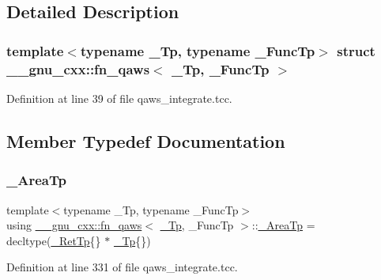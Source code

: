 \subsection{Detailed Description}
\subsubsection*{template$<$typename \+\_\+\+Tp, typename \+\_\+\+Func\+Tp$>$\newline
struct \+\_\+\+\_\+gnu\+\_\+cxx\+::fn\+\_\+qaws$<$ \+\_\+\+Tp, \+\_\+\+Func\+Tp $>$}



Definition at line 39 of file qaws\+\_\+integrate.\+tcc.



\subsection{Member Typedef Documentation}
\mbox{\label{struct____gnu__cxx_1_1fn__qaws_af9bc03c839ab7dc2e591b06cd3957a21}} 
\subsubsection{\texorpdfstring{\+\_\+\+Area\+Tp}{\_AreaTp}}
{\footnotesize\ttfamily template$<$typename \+\_\+\+Tp, typename \+\_\+\+Func\+Tp$>$ \\
using \hyperlink{struct____gnu__cxx_1_1fn__qaws}{\+\_\+\+\_\+gnu\+\_\+cxx\+::fn\+\_\+qaws}$<$ \hyperlink{namespace____gnu__cxx_a3b19a9c800ca194374ef9172290f7d79}{\+\_\+\+Tp}, \+\_\+\+Func\+Tp $>$\+::\hyperlink{struct____gnu__cxx_1_1fn__qaws_af9bc03c839ab7dc2e591b06cd3957a21}{\+\_\+\+Area\+Tp} =  decltype(\hyperlink{struct____gnu__cxx_1_1fn__qaws_afb28f16c42d0f494bfe2d48e2524a5b1}{\+\_\+\+Ret\+Tp}\{\} $\ast$ \hyperlink{namespace____gnu__cxx_a3b19a9c800ca194374ef9172290f7d79}{\+\_\+\+Tp}\{\})}



Definition at line 331 of file qaws\+\_\+integrate.\+tcc.

\mbox{\label{struct____gnu__cxx_1_1fn__qaws_afb28f16c42d0f494bfe2d48e2524a5b1}} 
